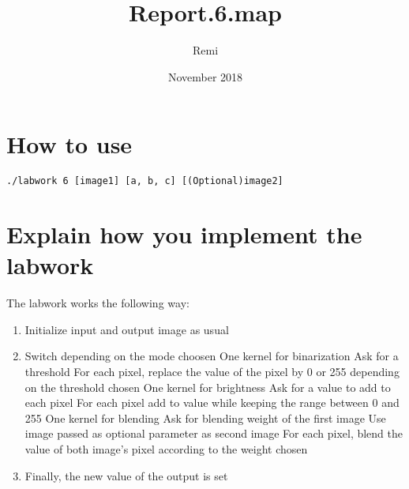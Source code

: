 \documentclass{article}
\title{ Report.6.map}
\author{Remi}
\date{November 2018}
\begin{document}
\maketitle

\section{How to use}

\begin{verbatim}
./labwork 6 [image1] [a, b, c] [(Optional)image2]
\end{verbatim}

\section{Explain how you implement the labwork}

The labwork works the following way:
\begin{enumerate}  
\item Initialize input and output image as usual
\item Switch depending on the mode choosen
    \subitem One kernel for binarization
        \subsubitem Ask for a threshold
        \subsubitem For each pixel, replace the value of the pixel by 0 or 255 depending on the threshold chosen
    \subitem One kernel for brightness
        \subsubitem Ask for a value to add to each pixel
        \subsubitem For each pixel add to value while keeping the range between 0 and 255
    \subitem One kernel for blending
        \subsubitem Ask for blending weight of the first image
        \subsubitem Use image passed as optional parameter as second image
        \subsubitem For each pixel, blend the value of both image's pixel according to the weight chosen
\item Finally, the new value of the output is set
\end{enumerate}
\end{document}

